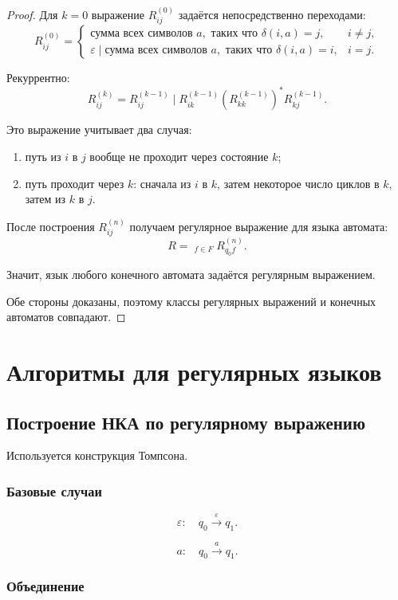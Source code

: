 \documentclass[12pt,a4paper]{article}
\newcommand{\eps}{\varepsilon}
\newcommand{\bigmid}{\mathop{\big|}}
\begin{document}
\begin{proof}
Для $k=0$ выражение $R_{ij}^{(0)}$ задаётся непосредственно переходами:
\[
R_{ij}^{(0)}=
\begin{cases}
\text{сумма всех символов } a,\text{ таких что } \delta(i,a)=j, & i\ne j,\\
\eps \mid \text{сумма всех символов } a,\text{ таких что } \delta(i,a)=i, & i=j.
\end{cases}
\]

Рекуррентно:
\[
R_{ij}^{(k)}
=
R_{ij}^{(k-1)}
\mid
R_{ik}^{(k-1)}
\left(R_{kk}^{(k-1)}\right)^*
R_{kj}^{(k-1)}.
\]

Это выражение учитывает два случая:
\begin{enumerate}
    \item путь из $i$ в $j$ вообще не проходит через состояние $k$;
    \item путь проходит через $k$: сначала из $i$ в $k$, затем некоторое число циклов в $k$, затем из $k$ в $j$.
\end{enumerate}

После построения $R_{ij}^{(n)}$ получаем регулярное выражение для языка автомата:
\[
R=\bigmid_{f\in F} R_{q_0 f}^{(n)}.
\]

Значит, язык любого конечного автомата задаётся регулярным выражением.

Обе стороны доказаны, поэтому классы регулярных выражений и конечных автоматов совпадают.
\end{proof}

\section{Алгоритмы для регулярных языков}

\subsection{Построение НКА по регулярному выражению}

Используется конструкция Томпсона.

\subsubsection*{Базовые случаи}

\[
\eps:
\quad
q_0\xrightarrow{\eps}q_1.
\]

\[
a:
\quad
q_0\xrightarrow{a}q_1.
\]

\subsubsection*{Объединение}
\end{document}
